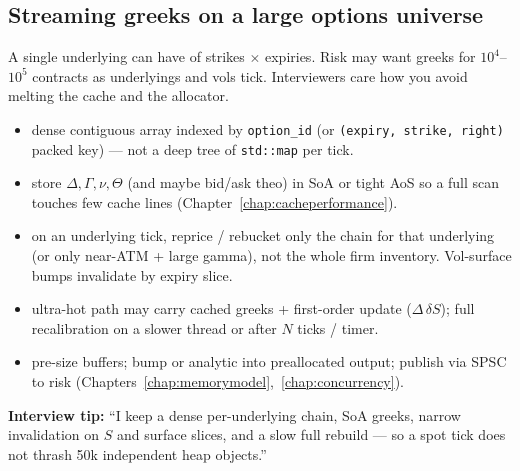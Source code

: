 \subsection{Streaming greeks on a large options universe}
\label{subsec:options-universe-greeks}
A single underlying can have  of strikes $\times$ expiries. 
Risk may want greeks for $10^4$--$10^5$ contracts as underlyings and vols tick. 
Interviewers care how you avoid melting the cache and the allocator.
\begin{itemize}
    \item {} dense contiguous array indexed by 
          \texttt{option\_id} (or \texttt{(expiry, strike, right)} packed key) --- 
          not a deep tree of \texttt{std::map} per tick.
    \item {} store $\Delta,\Gamma,\nu,\Theta$ (and 
          maybe bid/ask theo) in SoA or tight AoS so a full scan touches few cache 
          lines (Chapter~\ref{chap:cacheperformance}).
    \item {} on an underlying tick, reprice / rebucket 
          only the chain for that underlying (or only near-ATM + large gamma), not 
          the whole firm inventory. Vol-surface bumps invalidate by expiry slice.
    \item {} ultra-hot path may carry cached greeks + 
          first-order update ($\Delta\,\delta S$); full recalibration on a slower 
          thread or after $N$ ticks / timer.
    \item {} pre-size buffers; bump or analytic 
          into preallocated output; publish via SPSC to risk 
          (Chapters~\ref{chap:memorymodel},~\ref{chap:concurrency}).
\end{itemize}
\par\noindent\textbf{Interview tip:} ``I keep a dense per-underlying chain, SoA greeks, 
narrow invalidation on $S$ and surface slices, and a slow full rebuild --- so a 
spot tick does not thrash 50k independent heap objects.''

